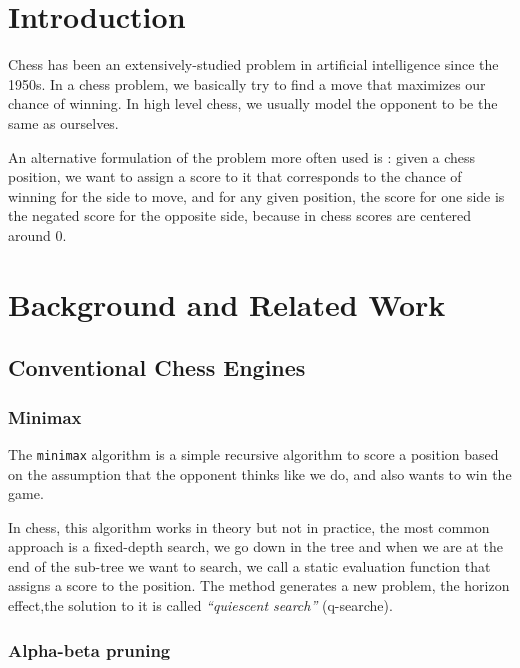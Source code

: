 \section{Introduction}

		Chess has been an extensively-studied problem in artificial intelligence since the 1950s. In a chess problem, we basically try to find a move that maximizes our chance of winning. In high level chess, we usually model the opponent to be the same as ourselves.

		An alternative formulation of the problem more often used is : given a chess position, we want to assign a score to it that corresponds to the chance of winning for the side to move, and for any given position, the score for one side is the negated score for the opposite side, because in chess scores are centered around 0.
		
	\section{Background and Related Work}
		\subsection{Conventional Chess Engines}
			\subsubsection{Minimax}
			
			The \verb|minimax| algorithm is a simple recursive algorithm to score a position based on the assumption that the opponent thinks like we do, and also wants to win the game.

			In chess, this algorithm works in theory but not in practice, the most common approach is a fixed-depth search, we go down in the tree and when we are at the end of the sub-tree we want to search, we call a static evaluation function that assigns a score to the position.
			The method generates a new problem, the horizon effect,the solution to it is called \emph{“quiescent search”} (q-searche).
			
			\subsubsection{Alpha-beta pruning}

